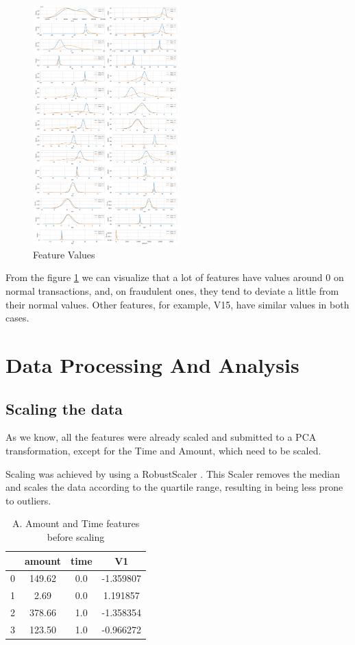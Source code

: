 \documentclass[conference]{IEEEtran}
\begin{document}
\begin{figure}[!htpb]
    \centerline{\includegraphics[width=0.5\textwidth]{images/feature_values.png}}
    \caption{Feature Values}
    \label{fig:feat_values}
\end{figure}

From the figure \ref{fig:feat_values} we can visualize that a lot of features have values around 0 on normal transactions, and, on fraudulent ones, they tend to deviate a little from their normal values. Other features, for example, V15, have similar values in both cases.

\section{Data Processing And Analysis}

\subsection{Scaling the data}

As we know, all the features were already scaled and submitted to a PCA transformation, except for the Time and Amount, which need to be scaled.

Scaling was achieved by using a RobustScaler \cite{sklearn_robust_scaler}. This Scaler removes the median and scales the data according to the quartile range, resulting in being less prone to outliers.

\begin{table}[H]
\caption{A. Amount and Time features before scaling}
\begin{center}
\begin{tabular}{|c|c|c|c|}
\hline
\textbf{} & \textbf{amount} & \textbf{time}& \textbf{V1} \\
\hline
0 & 149.62 & 0.0 & -1.359807 \\
1 & 2.69 & 0.0 & 1.191857 \\
2 & 378.66 & 1.0 & -1.358354 \\
3 & 123.50 & 1.0 & -0.966272 \\
\hline
\end{tabular}
\end{center}
\end{table}
\end{document}
